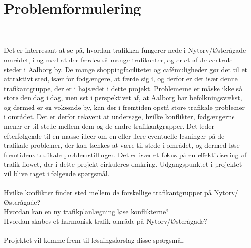 \chapter{Problemformulering}
\label{chap:problemformulering}

~\\\\
Det er interresant at se på, hvordan trafikken fungerer nede i Nytorv/Østerågade området, i og med at der færdes så mange trafikanter, og er et af de centrale steder i Aalborg by. De mange shoppingfaciliteter og cafémuligheder gør det til et attraktivt sted, især for fodgængere, at færde sig i, og derfor er det især denne trafikantgruppe, der er i højsædet i dette projekt. Problemerne er måske ikke så store den dag i dag, men set i perspektivet af, at Aalborg har befolkningsvækst, og dermed er en voksende by, kan der i fremtiden opstå store trafikale problemer i området. Det er derfor relavent at undersøge, hvilke konflikter, fodgængerne mener er til stede mellem dem og de andre trafikantgrupper.
Det leder efterfølgende til en masse ideer om en eller flere eventuelle løsninger på de trafikale problemer, der kan tænkes at være til stede i området, og dermed løse fremtidens trafikale problemstillinger. Det er især et fokus på en effektivisering af trafik flowet, der i dette projekt cirkuleres omkring. Udgangspunktet i projektet vil blive taget i følgende spørgsmål.
\\\\
Hvilke konflikter finder sted mellem de forskellige trafikantgrupper på Nytorv/Østerågade?
\\
Hvordan kan en ny trafikplanlægning løse konflikterne?
\\
Hvordan skabes et harmonisk trafik område på Nytorv/Østerågade? 
\\\\
Projektet vil komme frem til løsningsforslag disse spørgsmål.



